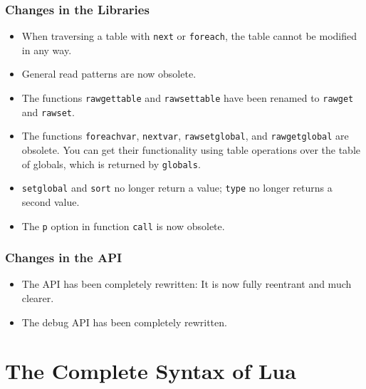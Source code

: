 \documentclass[11pt]{article}
\begin{document}
\subsubsection*{Changes in the Libraries}
\begin{itemize}

\item
When traversing a table with \verb|next| or \verb|foreach|,
the table cannot be modified in any way.

\item
General read patterns are now obsolete.

\item
The functions \verb|rawgettable| and \verb|rawsettable|
have been renamed to \verb|rawget| and \verb|rawset|.

\item
The functions \verb|foreachvar|, \verb|nextvar|,
\verb|rawsetglobal|, and \verb|rawgetglobal| are obsolete.
You can get their functionality using table operations
over the table of globals,
which is returned by \verb|globals|.

\item
\verb|setglobal| and \verb|sort| no longer return a value;
\verb|type| no longer returns a second value.

\item
The \verb|p| option in function \verb|call| is now obsolete.

\end{itemize}


\subsubsection*{Changes in the API}
\begin{itemize}

\item
The API has been completely rewritten:
It is now fully reentrant and much clearer.

\item
The debug API has been completely rewritten.

\end{itemize}

\section*{The Complete Syntax of Lua} \label{BNF}

\end{document}

